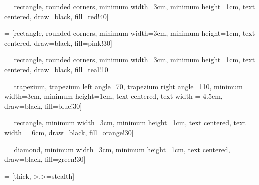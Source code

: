 \usepackage[utf8]{inputenc}
\usepackage{xcolor}
\usepackage{tikz} 
\usetikzlibrary{positioning,calc}
\usepackage{graphicx}
\usepackage{hyperref}
\usepackage{lastpage}
\usepackage{amsmath}
\usepackage{listings}
\usepackage{fontawesome}
\usepackage[center]{caption}
\usepackage{makecell}
\usepackage{adjustbox}
\usepackage{multirow}
\usepackage{multicol}
\usepackage{xspace} 
\usepackage{etoolbox} %
\usepackage{booktabs} %
\usepackage{pgfgantt} %

\newcommand*{\ClipSep}{0.06cm} %
\newcommand{\E}{\mathrm{e}\,} %
\lstset{numbers=left, numberstyle=\tiny, stepnumber=1,firstnumber=1,breaklines=true,
    numbersep=5pt,language=Python,
    stringstyle=\ttfamily,
    basicstyle=\footnotesize, 
    showstringspaces=false
}

\captionsetup{labelformat=empty}

%




\usepackage{tikz}
\usetikzlibrary{shapes.geometric, arrows}

 = [rectangle, rounded corners, minimum width=3cm, minimum height=1cm, text centered, draw=black, fill=red!40]

 = [rectangle, rounded corners, minimum width=3cm, minimum height=1cm, text centered, draw=black, fill=pink!30]

 = [rectangle, rounded corners, minimum width=3cm, minimum height=1cm, text centered, draw=black, fill=teal!10]

 = [trapezium, trapezium left angle=70, trapezium right angle=110, minimum width=3cm, minimum height=1cm, text centered, text width = 4.5cm, draw=black, fill=blue!30]

 = [rectangle, minimum width=3cm, minimum height=1cm, text centered, text width = 6cm, draw=black, fill=orange!30]

 = [diamond, minimum width=3cm, minimum height=1cm, text centered, draw=black, fill=green!30]

 = [thick,->,>=stealth]

